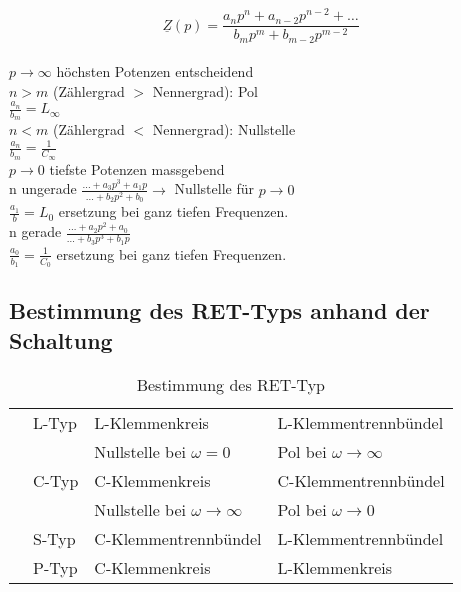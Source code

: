 $$\underline{Z}(p)=\frac{a_np^n+a_{n-2}p^{n-2}+\ldots}{b_mp^m+b_{m-2}p^{m-2}}$$\\
$p\rightarrow \infty$ höchsten Potenzen entscheidend\\
\hspace*{5pt}$n>m$ (Zählergrad $>$ Nennergrad): Pol\\
\hspace*{10pt}$\frac{a_n}{b_m}=L_{\infty}$\\
\hspace*{5pt}$n<m$ (Zählergrad $<$ Nennergrad): Nullstelle\\
\hspace*{10pt}$\frac{a_n}{b_m}=\frac{1}{C_{\infty}}$\\
$p\rightarrow 0$ tiefste Potenzen massgebend\\
\hspace*{5pt}n ungerade
$\frac{\ldots+a_3p^3+a_1p}{\ldots+b_2p^2+b_0}\rightarrow$ Nullstelle für $p\rightarrow 0$\\
\hspace*{10pt}$\frac{a_1}{b} = L_0$ ersetzung bei ganz tiefen Frequenzen.\\
\hspace*{5pt}n gerade $\frac{\ldots+a_2p^2+a_0}{\ldots+b_3p^3+b_1p}$\\
\hspace*{10pt}$\frac{a_0}{b_1}=\frac{1}{C_0}$ ersetzung bei ganz tiefen
Frequenzen.\\


\subsection{Bestimmung des RET-Typs anhand der Schaltung}
\begin{table}[H]
\begin{tabular}{|l|l|l|l|}
\hline
\parbox[c][1.5cm]{4.5cm}{} & L-Typ &
L-Klemmenkreis & L-Klemmentrennbündel\\
& & Nullstelle bei $\omega = 0$ & Pol bei $\omega \rightarrow \infty$ \\
\hline
\parbox[c][1.5cm]{4.5cm}{} & C-Typ &
C-Klemmenkreis & C-Klemmentrennbündel\\
& & Nullstelle bei $\omega \rightarrow \infty$ & Pol bei $\omega \rightarrow
0$\\
\hline
\parbox[c][1.5cm]{4.5cm}{} & S-Typ &
C-Klemmentrennbündel & L-Klemmentrennbündel\\
\hline
\parbox[c][1.5cm]{4.5cm}{} & P-Typ &
C-Klemmenkreis & L-Klemmenkreis\\
\hline
\end{tabular}
\caption{Bestimmung des RET-Typ}
\label{tab:RETTyp}
\end{table}

